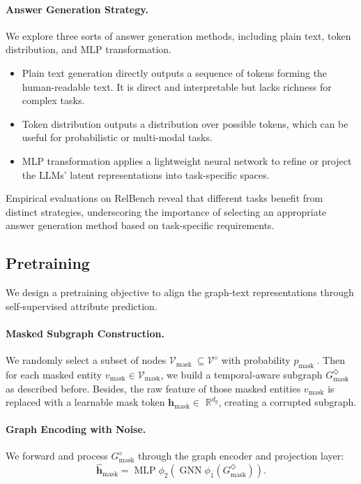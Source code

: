 \documentclass[11pt]{article}
\begin{document}
\paragraph{Answer Generation Strategy.} We explore three sorts of answer generation methods, including plain text, token distribution, and MLP transformation. 
\begin{itemize}
    \item  Plain text generation directly outputs a sequence of tokens forming the human-readable text. It is direct and interpretable but lacks richness for complex tasks. 
    \item Token distribution outputs a distribution over possible tokens, which can be useful for probabilistic or multi-modal tasks.
    \item MLP transformation applies a lightweight neural network to refine or project the LLMs’ latent representations into task-specific spaces.
\end{itemize}
Empirical evaluations on RelBench reveal that different tasks benefit from distinct strategies, underscoring the importance of selecting an appropriate answer generation method based on task-specific requirements.

\subsection{Pretraining}
We design a pretraining objective to align the graph-text representations through self-supervised attribute prediction. 

\paragraph{Masked Subgraph Construction.} We randomly select a subset of nodes $\mathcal{V}_{\text {mask }} \subseteq \mathcal{V}^{\diamond}$ with probability $p_{\text {mask }}$. Then for each masked entity $v_{\mathrm{mask}}\in \mathcal{V}_{\text {mask}}$, we build a temporal-aware subgraph $G^\Diamond_{\text{mask}}$ as described before. Besides, the raw feature of those masked entities $v_{\mathrm{mask}}$ is replaced with a learnable mask token $\mathbf{h}_{\text{mask}} \in$ $\mathbb{R}^{d_g}$, creating a corrupted subgraph.

\paragraph{Graph Encoding with Noise.} We forward and process $G_{\text{mask}}^{\diamond}$ through the graph encoder and projection layer:
\begin{equation}
    \hat{\mathbf{h}}_{\text{mask}} = \operatorname{MLP}{\phi_2}\left(\operatorname{GNN}{\phi_1}\left(G^\Diamond_{\text{mask}}\right)\right).
\end{equation}
\end{document}
